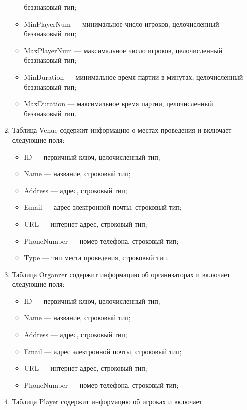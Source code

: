 \begin{enumerate}
\begin{itemize}[leftmargin=\parindent]
                беззнаковый тип;
            \item MinPlayerNum --- минимальное число игроков, целочисленный
                беззнаковый тип;
            \item MaxPlayerNum --- максимальное число игроков, целочисленный
                беззнаковый тип;
            \item MinDuration --- минимальное время партии в минутах,
                целочисленный беззнаковый тип;
            \item MaxDuration --- максимальное время партии, целочисленный
                беззнаковый тип.
        \end{itemize}
    \item Таблица Venue содержит информацию о местах проведения и включает
        следующие поля:
        \begin{itemize}[leftmargin=\parindent]
            \item ID --- первичный ключ, целочисленный тип;
            \item Name --- название, строковый тип;
            \item Address --- адрес, строковый тип;
            \item Email --- адрес электронной почты, строковый тип;
            \item URL --- интернет-адрес, строковый тип;
            \item PhoneNumber --- номер телефона, строковый тип;
            \item Type --- тип места проведения, строковый тип.
        \end{itemize}
    \item Таблица Organzer содержит информацию об организаторах и включает
        следующие поля:
        \begin{itemize}[leftmargin=\parindent]
            \item ID --- первичный ключ, целочисленный тип;
            \item Name --- название, строковый тип;
            \item Address --- адрес, строковый тип;
            \item Email --- адрес электронной почты, строковый тип;
            \item URL --- интернет-адрес, строковый тип;
            \item PhoneNumber --- номер телефона, строковый тип;
        \end{itemize}
    \item Таблица Player содержит информацию об игроках и включает

\end{enumerate}

